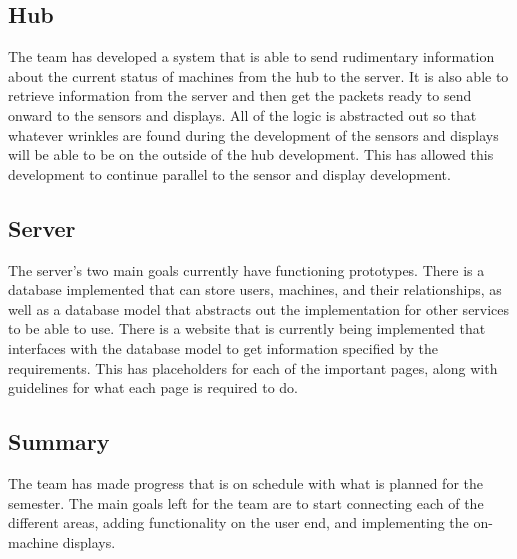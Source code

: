 \documentclass[letterpaper,11pt]{./templates/texMemo} %
\begin{document}
\subsection{Hub}
The team has developed a system that is able to send rudimentary information about the current status of machines from the hub to the server. It is also able to retrieve information from the server and then get the packets ready to send onward to the sensors and displays. All of the logic is abstracted out so that whatever wrinkles are found during the development of the sensors and displays will be able to be on the outside of the hub development. This has allowed this development to continue parallel to the sensor and display development.

\subsection{Server}
The server's two main goals currently have functioning prototypes. There is a database implemented that can store users, machines, and their relationships, as well as a database model that abstracts out the implementation for other services to be able to use. There is a website that is currently being implemented that interfaces with the database model to get information specified by the requirements. This has placeholders for each of the important pages, along with guidelines for what each page is required to do.

\subsection{Summary}
The team has made progress that is on schedule with what is planned for the semester. The main goals left for the team are to start connecting each of the different areas, adding functionality on the user end, and implementing the on-machine displays.
\end{document}
